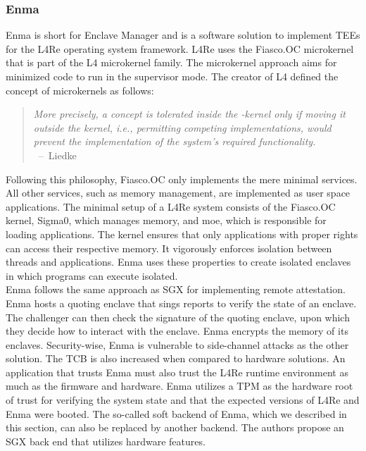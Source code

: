 \subsubsection{Enma}
\label{sec:20:enma}
Enma is short for Enclave Manager and is a software solution to implement TEEs
for the L4Re operating system framework. \cite{reitz_isolierende_2019}
L4Re uses the Fiasco.OC microkernel that is part of the L4 microkernel family.
The microkernel approach aims for minimized code to run in the supervisor mode.
The creator of L4 defined the concept of microkernels as follows:

\begin{quote}
    \textit{ More precisely, a concept is tolerated inside the \mu-kernel only
        if moving it outside the kernel, i.e., permitting competing
        implementations, would prevent the implementation of the system's
        required functionality. \\
    }
    \mbox{ -- Liedke\cite{liedtke1995micro}}
\end{quote}


Following this philosophy, Fiasco.OC only implements the mere minimal services.
All other services, such as memory management, are implemented as user space
applications. The minimal setup of a L4Re system consists of the Fiasco.OC
kernel, Sigma0, which manages memory, and moe, which is responsible for loading
applications. The kernel ensures that only applications with proper rights can
access their respective memory. It vigorously enforces isolation between threads
and applications. Enma uses these properties to create isolated enclaves in
which programs can execute isolated.\\

Enma follows the same approach as SGX for implementing remote attestation. Enma
hosts a quoting enclave that sings reports to verify the state of an enclave.
The challenger can then check the signature of the quoting enclave, upon which
they decide how to interact with the enclave. Enma encrypts the memory of its
enclaves. Security-wise, Enma is vulnerable to side-channel attacks as the other
solution. The TCB is also increased when compared to hardware solutions. An
application that trusts Enma must also trust the L4Re runtime environment as
much as the firmware and hardware. Enma utilizes a TPM as the hardware root of
trust for verifying the system state and that the expected versions of L4Re and
Enma were booted. The so-called soft backend of Enma, which we described in this
section, can also be replaced by another backend. The authors propose an SGX
back end that utilizes hardware features.

